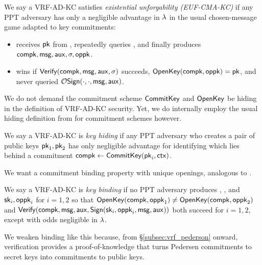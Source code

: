 \begin{definition}
We say a VRF-AD-KC satisfies {\em existential unforgability (EUF-CMA-KC)} if
any PPT adversary \adv has only a negligible advantage in $\lambda$
in the usual chosen-message game adapted to key commitments:
\begin{itemize}
 \item \adv receives $\mathsf{pk}$ from , %
 repeatedly queries ,
  and finally produces $\mathsf{compk},\mathsf{msg},\mathsf{aux},\sigma,\mathsf{oppk}$.
 \item \adv wins if ${\mathsf{Verify}}(\mathsf{compk},\mathsf{msg},\mathsf{aux},\sigma)$ succeeds,
  ${\mathsf{OpenKey}}(\mathsf{compk},\mathsf{oppk}) = \mathsf{pk}$, and
   \adv never queried $\mathcal{O}\mathsf{Sign}(\cdot,\cdot,\mathsf{msg},\mathsf{aux})$.
\end{itemize}
\end{definition}

We do not demand the commitment scheme ${\mathsf{CommitKey}}$ and ${\mathsf{OpenKey}}$
be hiding in the definition of VRF-AD-KC security.
Yet, we do internally employ the usual hiding definition from
\cite[pp.8]{cryptoeprint:2019:1185} for commitment schemes however.

\begin{definition}
We say a VRF-AD-KC is {\em key hiding} if any PPT adversary \adv
who creates a pair of public keys $\mathsf{pk}_1,\mathsf{pk}_2$
has only negligible advantage for identifying which lies behind a commitment
 $\mathsf{compk} \leftarrow {\ensuremath{\mathsf{CommitKey}}}(\mathsf{pk}_i,\mathsf{ctx})$.
\end{definition}

We want a commitment binding property with unique openings,
analogous to \cite[pp.9]{cryptoeprint:2019:1185}.

\begin{definition}\label{def:vrf_key_binding}
We say a VRF-AD-KC is {\em key binding} if no PPT adversary \adv
produces \compk, \msg, \aux and $\mathsf{sk}_i,\mathsf{oppk}_i$ for $i=1,2$
so that
 ${\mathsf{OpenKey}}(\mathsf{compk},\mathsf{oppk}_1) \ne {\ensuremath{\mathsf{OpenKey}}}(\mathsf{compk},\mathsf{oppk}_2)$ and
 ${\mathsf{Verify}}(\mathsf{compk},\mathsf{msg},\mathsf{aux},{\mathsf{Sign}}(\mathsf{sk}_i,\mathsf{oppk}_i,\mathsf{msg},\mathsf{aux}))$
both succeed for $i=1,2$, except with odds negligible in $\lambda$.
\end{definition}

We weaken binding like this because, from \S\ref{subsec:vrf_pederson}
onward, verification provides a proof-of-knowledge that turns
Pedersen commitments to secret keys into commitments to public keys.

